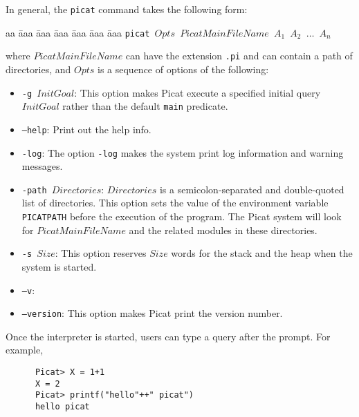 In general, the \texttt{picat} command takes the following form:
\begin{tabbing}
aa \= aaa \= aaa \= aaa \= aaa \= aaa \= aaa \kill
\> \texttt{picat $Opts$ $PicatMainFileName$ $A_1$ $A_2$ $\ldots$ $A_n$}
\end{tabbing}
where $PicatMainFileName$ can have the extension \texttt{.pi} and can contain a path of directories, and $Opts$ is a sequence of options of the following:
\begin{itemize}
\item \texttt{-g $InitGoal$}: This option makes Picat execute a specified initial query $InitGoal$ rather than the default \texttt{main} predicate.

\item \texttt{--help}: Print out the help info.

\item \texttt{-log}: The option \texttt{-log} makes the system print log information and warning messages. 

\item \texttt{-path $Directories$}: $Directories$ is a semicolon-separated and double-quoted list of directories. This option sets the value of the environment variable \texttt{PICATPATH} before the execution of the program. The Picat system will look for $PicatMainFileName$ and the related modules in these directories. 

\item \texttt{-s $Size$}: This option reserves $Size$ words for the stack and the heap when the system is started.

\item \texttt{--v}:
\item \texttt{--version}: This option makes Picat print the version number.
\end{itemize}

Once the interpreter is started, users can type a query after the prompt. For example,
\begin{verbatim}
      Picat> X = 1+1
      X = 2
      Picat> printf("hello"++" picat")
      hello picat
\end{verbatim}

